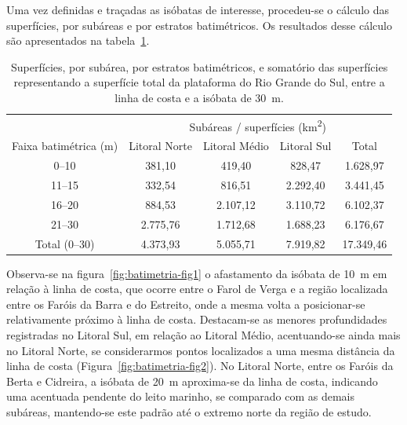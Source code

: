 \documentclass[a4paper,11pt,twoside,showtrims,onecolumn,openright,final]{memoir}
\begin{document}

Uma vez definidas e traçadas as isóbatas de interesse, procedeu-se o cálculo das superfícies, 
por subáreas e por estratos batimétricos. Os resultados desse cálculo são apresentados na 
tabela~\ref{tab:batimetria-tab1}.

%
%

\begin{table}
\caption[Superfícies, por subárea e estratos batimétricos da plataforma 
         do Rio Grande do Sul até a isóbata de 30~m]
        {Superfícies, por subárea, por estratos batimétricos, e somatório das superfícies 
         representando a superfície total da plataforma do Rio Grande do Sul, entre a linha 
         de costa e a isóbata de 30~m.}
\label{tab:batimetria-tab1}	 
\begin{center}
\begin{tabular*}{\textwidth}{c@{\extracolsep{\fill}}cccc}
\toprule
				& 	\multicolumn{4}{c}{Subáreas / superfícies (km\textsuperscript{2})}		\\
\cmidrule(l){2-5}
Faixa batimétrica (m)		& Litoral Norte		& Litoral Médio		& Litoral Sul		& Total		\\
\midrule
0--10				& 381,10		& 419,40		& 828,47		& 1.628,97	\\
11--15				& 332,54		& 816,51		& 2.292,40		& 3.441,45	\\
16--20				& 884,53		& 2.107,12		& 3.110,72		& 6.102,37	\\
21--30				& 2.775,76		& 1.712,68		& 1.688,23		& 6.176,67	\\
\midrule
Total (0--30)			& 4.373,93		& 5.055,71		& 7.919,82		& 17.349,46	\\
\bottomrule
\end{tabular*}
\end{center}
\end{table}


Observa-se na figura~\ref{fig:batimetria-fig1} o afastamento da isóbata de 10~m em relação à linha de costa, 
que ocorre entre o Farol de Verga e a região localizada entre os Faróis da Barra e do Estreito, 
onde a mesma volta a posicionar-se relativamente próximo à linha de costa. Destacam-se as menores 
profundidades registradas no Litoral Sul, em relação ao Litoral Médio, acentuando-se ainda mais 
no Litoral Norte, se considerarmos pontos localizados a uma mesma distância da linha de costa (Figura~\ref{fig:batimetria-fig2}).
No Litoral Norte, entre os Faróis da Berta e Cidreira, a isóbata de 20~m aproxima-se da linha de costa, 
indicando uma acentuada pendente do leito marinho, se comparado com as demais subáreas, mantendo-se 
este padrão até o extremo norte da região de estudo.
\end{document}
